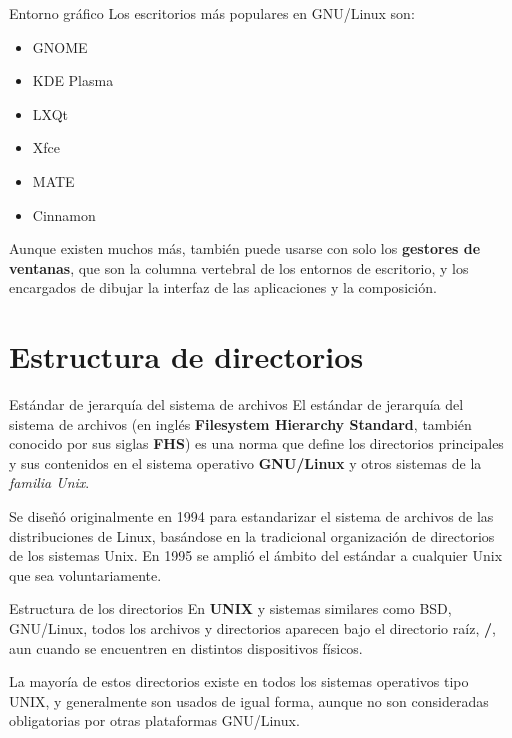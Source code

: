 \begin{frame}[c]{Entorno gráfico}
  Los escritorios más populares en GNU/Linux son:

  \begin{itemize}
    \item GNOME
    \item KDE Plasma
    \item LXQt
    \item Xfce
    \item MATE
    \item Cinnamon
  \end{itemize}

  Aunque existen muchos más, también puede usarse con solo los
  \textbf{gestores de ventanas}, que son la columna vertebral de los entornos
  de escritorio, y los encargados de dibujar la interfaz de las aplicaciones
  y la composición.
\end{frame}

\section{Estructura de directorios}

\begin{frame}[c]{Estándar de jerarquía del sistema de archivos}
  El estándar de jerarquía del sistema de archivos (en inglés \textbf{Filesystem
  Hierarchy Standard}, también conocido por sus siglas \textbf{FHS}) es una
  norma que define los directorios principales y sus contenidos en el sistema
  operativo \textbf{GNU/Linux} y otros sistemas de la \emph{familia Unix}.

  \vspace{\baselineskip}
  Se diseñó originalmente en 1994 para estandarizar el sistema de archivos de
  las distribuciones de Linux, basándose en la tradicional organización de
  directorios de los sistemas Unix. En 1995 se amplió el ámbito del estándar
  a cualquier Unix que sea voluntariamente.
\end{frame}

\begin{frame}[c]{Estructura de los directorios}
  En \textbf{UNIX} y sistemas similares como BSD, GNU/Linux, todos los
  archivos y directorios aparecen bajo el directorio raíz, \textbf{/},
  aun cuando se encuentren en distintos dispositivos físicos.

  \vspace{\baselineskip}
  La mayoría de estos directorios existe en todos los sistemas operativos
  tipo UNIX, y generalmente son usados de igual forma, aunque no son
  consideradas obligatorias por otras plataformas GNU/Linux.
\end{frame}

